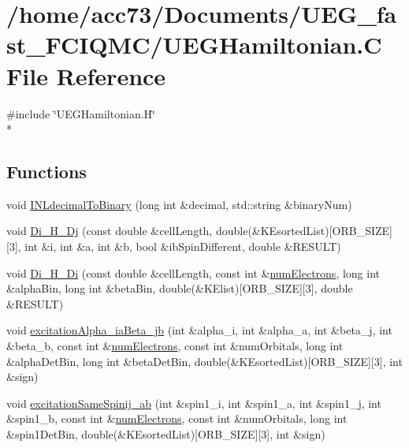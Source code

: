 \hypertarget{UEGHamiltonian_8C}{\section{/home/acc73/\-Documents/\-U\-E\-G\-\_\-fast\-\_\-\-F\-C\-I\-Q\-M\-C/\-U\-E\-G\-Hamiltonian.C File Reference}
\label{UEGHamiltonian_8C}
}
{\ttfamily \#include \char`\"{}U\-E\-G\-Hamiltonian.\-H\char`\"{}}\\*
\subsection*{Functions}
\begin{DoxyCompactItemize}
\item 
void \hyperlink{UEGHamiltonian_8C_ad349fcf2533ef69216553d20f96d6320}{I\-N\-Ldecimal\-To\-Binary} (long int \&decimal, std\-::string \&binary\-Num)
\item 
void \hyperlink{UEGHamiltonian_8C_ac49d093e43e654317ebc138e4ec744dd}{Di\-\_\-\-H\-\_\-\-Dj} (const double \&cell\-Length, double(\&K\-Esorted\-List)\mbox{[}O\-R\-B\-\_\-\-S\-I\-Z\-E\mbox{]}\mbox{[}3\mbox{]}, int \&i, int \&a, int \&b, bool \&ib\-Spin\-Different, double \&R\-E\-S\-U\-L\-T)
\item 
void \hyperlink{UEGHamiltonian_8C_a72450954a1e868acec0abb9b40eea196}{Di\-\_\-\-H\-\_\-\-Di} (const double \&cell\-Length, const int \&\hyperlink{UEG__MAIN__binarytest_8C_a613e167ad809e33c73b70a24822cc6f9}{num\-Electrons}, long int \&alpha\-Bin, long int \&beta\-Bin, double(\&K\-Elist)\mbox{[}O\-R\-B\-\_\-\-S\-I\-Z\-E\mbox{]}\mbox{[}3\mbox{]}, double \&R\-E\-S\-U\-L\-T)
\item 
void \hyperlink{UEGHamiltonian_8C_a0f083f849adf99409ad61ff7d9ab2dea}{excitation\-Alpha\-\_\-ia\-Beta\-\_\-jb} (int \&alpha\-\_\-i, int \&alpha\-\_\-a, int \&beta\-\_\-j, int \&beta\-\_\-b, const int \&\hyperlink{UEG__MAIN__binarytest_8C_a613e167ad809e33c73b70a24822cc6f9}{num\-Electrons}, const int \&num\-Orbitals, long int \&alpha\-Det\-Bin, long int \&beta\-Det\-Bin, double(\&K\-Esorted\-List)\mbox{[}O\-R\-B\-\_\-\-S\-I\-Z\-E\mbox{]}\mbox{[}3\mbox{]}, int \&sign)
\item 
void \hyperlink{UEGHamiltonian_8C_aa6447c7741a98dd5076411e98357c9d7}{excitation\-Same\-Spinij\-\_\-ab} (int \&spin1\-\_\-i, int \&spin1\-\_\-a, int \&spin1\-\_\-j, int \&spin1\-\_\-b, const int \&\hyperlink{UEG__MAIN__binarytest_8C_a613e167ad809e33c73b70a24822cc6f9}{num\-Electrons}, const int \&num\-Orbitals, long int \&spin1\-Det\-Bin, double(\&K\-Esorted\-List)\mbox{[}O\-R\-B\-\_\-\-S\-I\-Z\-E\mbox{]}\mbox{[}3\mbox{]}, int \&sign)
\end{DoxyCompactItemize}


